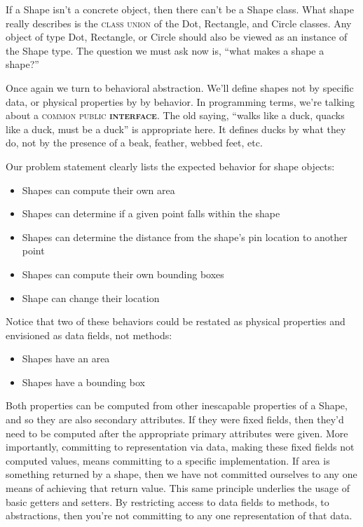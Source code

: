 \documentclass[nobib]{tufte-handout}
\begin{document}
If a Shape isn't a concrete object, then there can't be a Shape class. What shape really describes is the \textsc{class union} of the Dot, Rectangle, and Circle classes. Any object of type Dot, Rectangle, or Circle should also be viewed as an instance of the Shape type. The question we must ask now is, ``what makes a shape a shape?''

Once again we turn to behavioral abstraction. We'll define shapes not by specific data, or physical properties by by behavior. In programming terms, we're talking about a \textsc{common public \textbf{interface}}. The old saying, ``walks like a duck, quacks like a duck, must be a duck'' is appropriate here. It defines ducks by what they do, not by the presence of a beak, feather, webbed feet, etc.

Our problem statement clearly lists the expected behavior for shape objects:
\begin{itemize}
\item Shapes can compute their own area
\item Shapes can determine if a given point falls within the shape
\item Shapes can determine the distance from the shape's pin location to another point
\item Shapes can compute their own bounding boxes
\item Shape  can change their location
\end{itemize}

Notice that two of these behaviors could be restated as physical properties and envisioned as data fields, not methods:
\begin{itemize}
\item Shapes have an area
\item Shapes have a bounding box
\end{itemize}
Both properties can be computed from other inescapable properties of a Shape, and so  they are also secondary attributes. If they were fixed fields, then they'd need to be computed after the appropriate primary attributes were given. More importantly, committing to representation via data, making these fixed fields not computed values, means committing to a specific implementation.  If area is something returned by a shape, then we have not committed ourselves to any one means of achieving that return value. This same principle underlies the usage of basic getters and setters. By restricting access to data fields to methods, to abstractions, then you're not committing to any one representation of that data.
\end{document}
